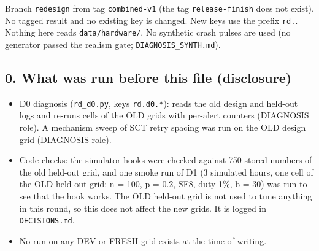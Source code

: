 


Branch \texttt{redesign} from tag \texttt{combined-v1} (the tag \texttt{release-finish} does not exist). No tagged result and no existing key is changed. New keys use the prefix \texttt{rd.}. Nothing here reads \texttt{data/hardware/}. No synthetic crash pulses are used (no generator passed the realism gate; \texttt{DIAGNOSIS\_SYNTH.md}).

\subsection*{0. What was run before this file (disclosure)}
\begin{itemize}
\item D0 diagnosis (\texttt{rd\_d0.py}, keys \texttt{rd.d0.*}): reads the old design and held-out logs and re-runs cells of the OLD grids with per-alert counters (DIAGNOSIS role). A mechanism sweep of SCT retry spacing was run on the OLD design grid (DIAGNOSIS role).
\item Code checks: the simulator hooks were checked against 750 stored numbers of the old held-out grid, and one smoke run of D1 (3 simulated hours, one cell of the OLD held-out grid: n = 100, p = 0.2, SF8, duty 1\%, b = 30) was run to see that the hook works. The OLD held-out grid is not used to tune anything in this round, so this does not affect the new grids. It is logged in \texttt{DECISIONS.md}.
\item No run on any DEV or FRESH grid exists at the time of writing.
\end{itemize}

